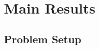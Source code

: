 \documentclass{article}
\def \xhat {\mathbf{\hat{x}}}
\begin{document}



\section{Main Results}

\subsection{Problem Setup} \label{setup}
\par
\end{document}
